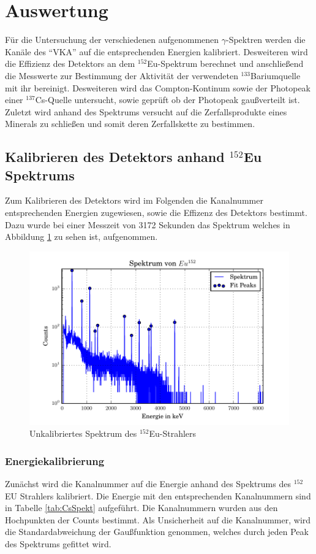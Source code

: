 \section{Auswertung}
\label{sec:Auswertung}
Für die Untersuchung der verschiedenen aufgenommenen $\gamma$-Spektren werden die Kanäle des ``VKA'' auf die entsprechenden Energien kalibriert. Desweiteren wird die Effizienz des Detektors an dem $^{152}$Eu-Spektrum berechnet und anschließend die Messwerte zur Bestimmung der Aktivität der verwendeten $^{133}$Bariumquelle mit ihr bereinigt. Desweiteren wird das Compton-Kontinum sowie der Photopeak einer $^{137}$Cs-Quelle untersucht, sowie geprüft ob der Photopeak gaußverteilt ist. Zuletzt wird anhand des Spektrums versucht auf die Zerfallsprodukte eines Minerals zu schließen und somit deren Zerfallskette zu bestimmen.


\subsection{Kalibrieren des Detektors anhand $^{152}$Eu Spektrums}
Zum Kalibrieren des Detektors wird im Folgenden die Kanalnummer entsprechenden Energien zugewiesen, sowie die Effizenz des Detektors bestimmt. Dazu wurde bei einer Messzeit von 3172 Sekunden das Spektrum welches in Abbildung \ref{fig:spekEu} zu sehen ist, aufgenommen.
\begin{figure}[H]
  \centering
  \includegraphics[width=\textwidth]{./build/SpektEu.pdf}
  \caption{Unkalibriertes Spektrum des $^{152}$Eu-Strahlers}
  \label{fig:spekEu}
\end{figure}

\subsubsection{Energiekalibrierung}
\label{sec:Kalb}
Zunächst wird die Kanalnummer auf die Energie anhand des Spektrums des $^{152}$EU Strahlers kalibriert. Die Energie mit den entsprechenden Kanalnummern sind in Tabelle \ref{tab:CsSpekt} aufgeführt. Die Kanalnummern wurden aus den Hochpunkten der Counts bestimmt. Als Unsicherheit auf die Kanalnummer, wird die Standardabweichung der Gaußfunktion genommen, welches durch jeden Peak des Spektrums gefittet wird.

